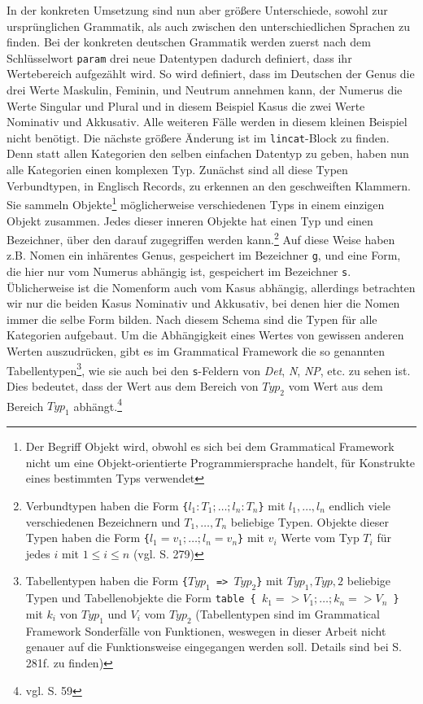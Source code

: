 In der konkreten Umsetzung sind nun aber größere Unterschiede, sowohl zur ursprünglichen Grammatik, als auch zwischen den unterschiedlichen Sprachen zu finden. Bei der konkreten deutschen Grammatik werden zuerst nach dem Schlüsselwort \texttt{param} drei neue Datentypen dadurch definiert, dass ihr Wertebereich aufgezählt wird. So wird definiert, dass im Deutschen der Genus die drei Werte Maskulin, Feminin, und Neutrum annehmen kann, der Numerus die Werte Singular und Plural und in diesem Beispiel Kasus die zwei Werte Nominativ und Akkusativ. Alle weiteren Fälle werden in diesem kleinen Beispiel nicht benötigt. Die nächste größere Änderung ist im \texttt{lincat}-Block zu finden. Denn statt allen Kategorien den selben einfachen Datentyp zu geben, haben nun alle Kategorien einen komplexen Typ. Zunächst sind all diese Typen Verbundtypen, in Englisch Records, zu erkennen an den geschweiften Klammern. Sie sammeln Objekte\footnote{Der Begriff Objekt wird, obwohl es sich bei dem Grammatical Framework nicht um eine Objekt-orientierte Programmiersprache handelt, für Konstrukte eines bestimmten Typs verwendet} möglicherweise verschiedenen Typs in einem einzigen Objekt zusammen. Jedes dieser inneren Objekte hat einen Typ und einen Bezeichner, über den darauf zugegriffen werden kann.\footnote{Verbundtypen haben die Form \texttt{\{$l_1 : T_1 ; \dots ; l_n : T_n$\}} mit $l_1, \dots, l_n$ endlich viele verschiedenen Bezeichnern und $T_1, \dots, T_n$ beliebige Typen. Objekte dieser Typen haben die Form \texttt{\{$l_1 = v_1 ; \dots ; l_n = v_n$\}} mit $v_i$ Werte vom Typ $T_i$ für jedes $i$ mit $1\leq i\leq n$ (vgl. \cite{RANTA2011} S. 279)} Auf diese Weise haben z.B. Nomen ein inhärentes Genus, gespeichert im Bezeichner \texttt{g}, und eine Form, die hier nur vom Numerus abhängig ist, gespeichert im Bezeichner \texttt{s}. Üblicherweise ist die Nomenform auch vom Kasus abhängig, allerdings betrachten wir nur die beiden Kasus Nominativ und Akkusativ, bei denen hier die Nomen immer die selbe Form bilden. Nach diesem Schema sind die Typen für alle Kategorien aufgebaut. Um die Abhängigkeit eines Wertes von gewissen anderen Werten auszudrücken, gibt es im Grammatical Framework die so genannten Tabellentypen\footnote{Tabellentypen haben die Form \texttt{\{$Typ_1$ => $Typ_2$\}} mit $Typ_1,Typ,2$ beliebige Typen und Tabellenobjekte die Form \texttt{table \{ $k_1 => V_1 ; \dots ; k_n => V_n$ \}} mit $k_i$ von $Typ_1$ und $V_i$ vom $Typ_2$ (Tabellentypen sind im Grammatical Framework Sonderfälle von Funktionen, weswegen in dieser Arbeit nicht genauer auf die Funktionsweise eingegangen werden soll. Details sind bei \cite{RANTA2011} S. 281f. zu finden)}, wie sie auch bei den \texttt{s}-Feldern von \textit{Det}, \textit{N}, \textit{NP}, etc. zu sehen ist. Dies bedeutet, dass der Wert aus dem Bereich von $Typ_2$ vom Wert aus dem Bereich $Typ_1$ abhängt.\footnote{vgl. \cite{RANTA2011} S. 59} \par
